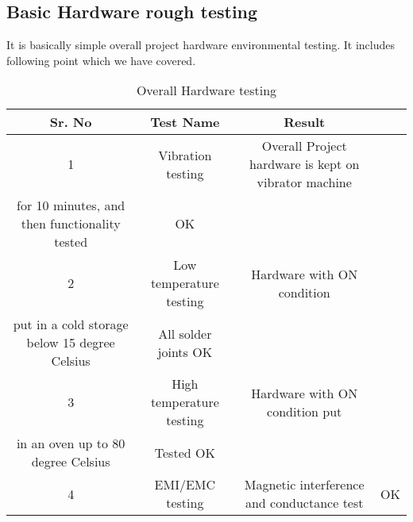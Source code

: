 \documentclass[12pt,Times]{report}
\begin{document}
\subsection{Basic Hardware rough testing}
It is basically simple overall project hardware environmental testing. It includes following point which we have covered.
\begin{table}[htbp]
	\caption{Overall Hardware testing}
	\label{tab:Overall Hardware testing}
	 \begin{tabular}{|c|c|c|c|} 
 \hline
 \textbf{Sr. No} &\textbf{Test Name} & \textbf{Result}\\ [0.5ex] 
 \hline
1& Vibration testing&Overall Project hardware is kept on vibrator machine\\ for 10 minutes, and then functionality tested& OK\\
\hline
2&Low temperature testing&Hardware with ON condition\\ put in a cold storage below 15 degree Celsius& All solder joints OK\\
\hline
3&High temperature testing&Hardware with ON condition put\\ in an oven up to 80 degree Celsius&Tested OK\\
\hline
4&EMI/EMC testing&Magnetic interference and conductance test&OK\\
\hline

\end{tabular}	 
\end{table}
\end{document}
